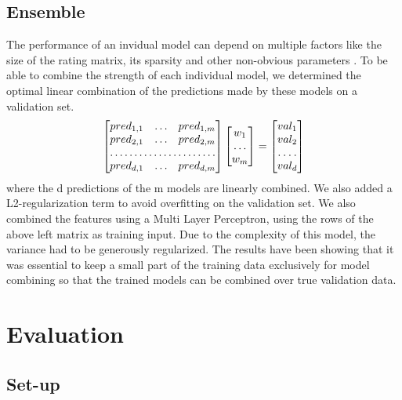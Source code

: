\documentclass[10pt,conference,compsocconf]{IEEEtran}
\begin{document}
\subsection{Ensemble}
The performance of an invidual model can depend on multiple factors like the size of the rating matrix, its sparsity and other non-obvious parameters \cite{comparative}. 
To be able to combine the strength of each individual model, we determined the optimal linear combination of the predictions made by these models on a validation set. 
\[
\begin{bmatrix}
    pred_{1,1}  & \hdots & pred_{1,m}\\
    pred_{2,1}  & \hdots & pred_{2,m}\\
    \hdotsfor{3} \\
    pred_{d,1}  & \hdots & pred_{d,m}
\end{bmatrix}
\begin{bmatrix}
    w_{1}\\
    \hdots \\
    w_{m}\\
\end{bmatrix}
=
\begin{bmatrix}
    val_{1}\\
    val_{2}\\
    \hdotsfor{1} \\
    val_{d}
\end{bmatrix}
\]
where the d predictions of the m models are linearly combined. We also added a L2-regularization term to avoid overfitting on the validation set. 
\newline
We also combined the features using a Multi Layer Perceptron, using the rows of the above left matrix as training input. Due to the complexity of this model, the variance had to be generously regularized. 
\newline
The results have been showing that it was essential to keep a small part of the training data exclusively for model combining so that the trained models can be combined over true validation data.  

\section{Evaluation}
\label{res}

\subsection{Set-up}
\end{document}
